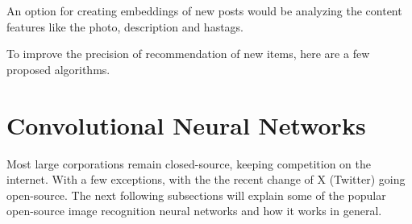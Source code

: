 An option for creating embeddings of new posts would be analyzing the content features like the photo, description and hastags.

To improve the precision of recommendation of new items, here are a few proposed algorithms. 

\section{Convolutional Neural Networks}\label{cnn}

Most large corporations remain closed-source, keeping competition on the internet. With a few exceptions, with the the recent change of X (Twitter) going open-source. The next following subsections will explain some of the popular open-source image recognition neural networks and how it works in general.


